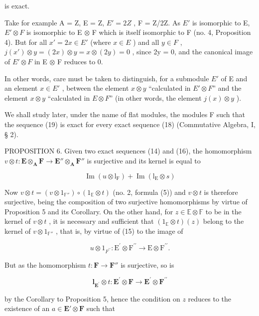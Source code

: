 is exact.

Take for example A = Z, E = Z, \(E' = 2Z\) , F = Z/2Z. As \(E'\) is isomorphic to E, \(E' \otimes F\) is isomorphic to E \(\otimes\) F which is itself isomorphic to F (no. 4, Proposition 4). But for all \(x' = 2x \in E'\) (where \(x \in E\) ) and all \(y \in F\) , \(j(x') \otimes y = (2x) \otimes y = x \otimes (2y) = 0\) , since 2y = 0, and the canonical image of \(E' \otimes F\) in E \(\otimes\) F reduces to 0.

In other words, care must be taken to distinguish, for a submodule \(E'\) of E and an element \(x \in E'\) , between the element \(x \otimes y\) ``calculated in \(E' \otimes F\)'' and the element \(x \otimes y\) ``calculated in \(E \otimes F\)'' (in other words, the element \(j(x) \otimes y\) ).

We shall study later, under the name of flat modules, the modules F such that the sequence (19) is exact for every exact sequence (18) (Commutative Algebra, I, § 2).

PROPOSITION 6. Given two exact sequences (14) and (16), the homomorphism \(v \otimes t: \mathbf{E} \otimes_{\mathbf{A}} \mathbf{F} \to \mathbf{E}'' \otimes_{\mathbf{A}} \mathbf{F}''\) is surjective and its kernel is equal to

\[
\operatorname{Im} (u \otimes \mathrm{l} _ {\mathrm{F}}) + \operatorname{Im} (\mathrm{l} _ {\mathrm{E}} \otimes s)
\]

Now \(v \otimes t = (v \otimes 1_{\mathbb{F}''}) \circ (1_{\mathbb{E}} \otimes t)\) (no. 2, formula (5)) and \(v \otimes t\) is therefore surjective, being the composition of two surjective homomorphisms by virtue of Proposition 5 and its Corollary. On the other hand, for \(z \in \mathbb{E} \otimes \mathbb{F}\) to be in the kernel of \(v \otimes t\) , it is necessary and sufficient that \((1_{\mathbb{E}} \otimes t) (z)\) belong to the kernel of \(v \otimes 1_{\mathbb{F}''}\) , that is, by virtue of (15) to the image of

\[
u \otimes 1 _ {F ^ {\prime \prime}}: \mathrm{E} ^ {\prime} \otimes \mathrm{F} ^ {\prime \prime} \rightarrow \mathrm{E} \otimes \mathrm{F} ^ {\prime \prime}.
\]

But as the homomorphism \(t: \mathbf{F} \to \mathbf{F}''\) is surjective, so is

\[
\mathbf {l} _ {\mathbf {E} ^ {\prime}} \otimes t: \mathbf {E} ^ {\prime} \otimes \mathbf {F} \rightarrow \mathbf {E} ^ {\prime} \otimes \mathbf {F} ^ {\prime \prime}
\]

by the Corollary to Proposition 5, hence the condition on \(z\) reduces to the existence of an \(a \in \mathbf{E}' \otimes \mathbf{F}\) such that

